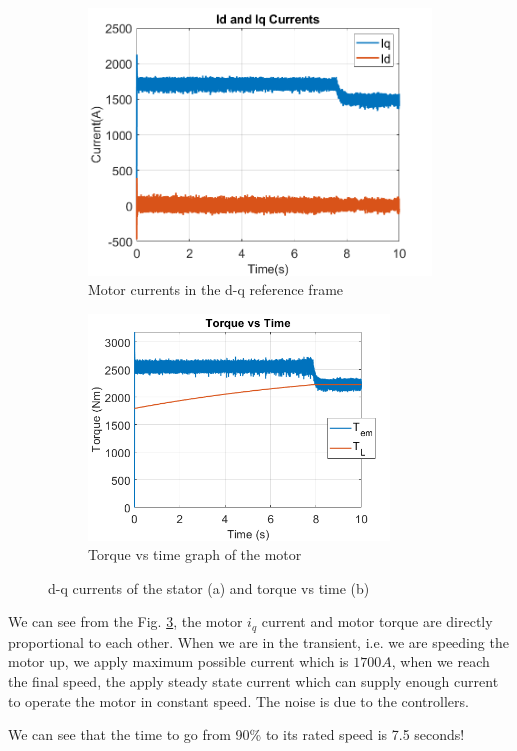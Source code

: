 \begin{figure}[H]
        \centering
        \begin{subfigure}[b]{0.475\textwidth}
            \centering
        \includegraphics [width= 8 cm]{figs/Partb-1-IdIq.png}
        \caption{Motor currents in the d-q reference frame }
        \label{fig:id}
        \end{subfigure}
        \hfill
        \begin{subfigure}[b]{0.475\textwidth}  
            \centering
        \includegraphics [width= 8cm]{figs/torque_new.png} %
        \caption{Torque vs time graph of the motor}
        \label{fig:t1}
        \end{subfigure}
        \caption{d-q currents of the stator (a) and torque vs time (b)}
        \label{fig:3phase_torque}
        \end{figure}

We can see from the Fig. \ref{fig:3phase_torque}, the motor $i_q$ current and motor torque are directly proportional to each other. When we are in the transient, i.e. we are speeding the motor up, we apply maximum possible current which is $1700A$, when we reach the final speed, the apply steady state current which can supply enough current to operate the motor in constant speed. The noise is due to the controllers.

We can see that the time to go from 90\% to its rated speed is 7.5 seconds!

